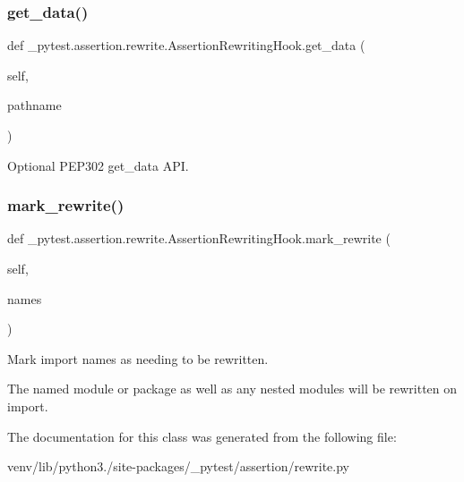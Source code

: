 \subsubsection{\texorpdfstring{get\+\_\+data()}{get\_data()}}
{\footnotesize\ttfamily def \+\_\+pytest.\+assertion.\+rewrite.\+Assertion\+Rewriting\+Hook.\+get\+\_\+data (\begin{DoxyParamCaption}\item[{}]{self,  }\item[{}]{pathname }\end{DoxyParamCaption})}

\begin{DoxyVerb}Optional PEP302 get_data API.
\end{DoxyVerb}
 \mbox{\label{class__pytest_1_1assertion_1_1rewrite_1_1_assertion_rewriting_hook_a49c937758dd2c23067a120cbbb34eb76}} 
\subsubsection{\texorpdfstring{mark\+\_\+rewrite()}{mark\_rewrite()}}
{\footnotesize\ttfamily def \+\_\+pytest.\+assertion.\+rewrite.\+Assertion\+Rewriting\+Hook.\+mark\+\_\+rewrite (\begin{DoxyParamCaption}\item[{}]{self,  }\item[{}]{names }\end{DoxyParamCaption})}

\begin{DoxyVerb}Mark import names as needing to be rewritten.

The named module or package as well as any nested modules will
be rewritten on import.
\end{DoxyVerb}
 

The documentation for this class was generated from the following file\+:\begin{DoxyCompactItemize}
\item 
venv/lib/python3./site-\/packages/\+\_\+pytest/assertion/rewrite.\+py\end{DoxyCompactItemize}
